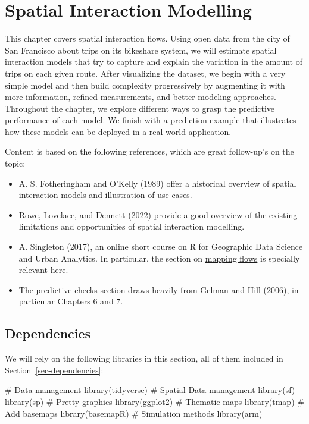 \documentclass[
  letterpaper,
  DIV=11,
  numbers=noendperiod,
  oneside]{scrreprt}
\newenvironment{Shaded}{\begin{snugshade}}{\end{snugshade}}
\newcommand{\CommentTok}[1]{\textcolor[rgb]{0.37,0.37,0.37}{#1}}
\newcommand{\FunctionTok}[1]{\textcolor[rgb]{0.28,0.35,0.67}{#1}}
\newcommand{\NormalTok}[1]{\textcolor[rgb]{0.00,0.23,0.31}{#1}}
\providecommand{\tightlist}{%
  \setlength{\itemsep}{0pt}\setlength{\parskip}{0pt}}\usepackage{longtable,booktabs,array}
\begin{document}

\chapter{Spatial Interaction Modelling}\label{sec-chp5}

This chapter covers spatial interaction flows. Using open data from the
city of San Francisco about trips on its bikeshare system, we will
estimate spatial interaction models that try to capture and explain the
variation in the amount of trips on each given route. After visualizing
the dataset, we begin with a very simple model and then build complexity
progressively by augmenting it with more information, refined
measurements, and better modeling approaches. Throughout the chapter, we
explore different ways to grasp the predictive performance of each
model. We finish with a prediction example that illustrates how these
models can be deployed in a real-world application.

Content is based on the following references, which are great
follow-up's on the topic:

\begin{itemize}
\tightlist
\item
  A. S. Fotheringham and O'Kelly (1989) offer a historical overview of
  spatial interaction models and illustration of use cases.
\item
  Rowe, Lovelace, and Dennett (2022) provide a good overview of the
  existing limitations and opportunities of spatial interaction
  modelling.
\item
  A. Singleton (2017), an online short course on R for Geographic Data
  Science and Urban Analytics. In particular, the section on
  \href{https://github.com/alexsingleton/GDS_UA_2017/tree/master/Mapping_Flows}{mapping
  flows} is specially relevant here.
\item
  The predictive checks section draws heavily from Gelman and Hill
  (2006), in particular Chapters 6 and 7.
\end{itemize}

\section{Dependencies}\label{dependencies-2}

We will rely on the following libraries in this section, all of them
included in Section~\ref{sec-dependencies}:

\begin{Shaded}
\begin{Highlighting}[]
\CommentTok{\# Data management}
\FunctionTok{library}\NormalTok{(tidyverse)}
\CommentTok{\# Spatial Data management}
\FunctionTok{library}\NormalTok{(sf)}
\FunctionTok{library}\NormalTok{(sp)}
\CommentTok{\# Pretty graphics}
\FunctionTok{library}\NormalTok{(ggplot2)}
\CommentTok{\# Thematic maps}
\FunctionTok{library}\NormalTok{(tmap)}
\CommentTok{\# Add basemaps}
\FunctionTok{library}\NormalTok{(basemapR)}
\CommentTok{\# Simulation methods}
\FunctionTok{library}\NormalTok{(arm)}
\end{Highlighting}
\end{Shaded}
\end{document}
